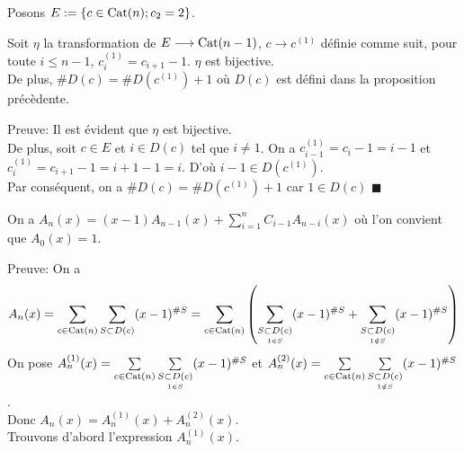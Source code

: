 Posons $E:=\{c \in \begin{rm}Cat\end{rm}(n); c_{2}=2\}$.
\begin{lemme}
	Soit $\eta$ la transformation de $E \longrightarrow \begin{rm}Cat\end{rm}(n-1)$, $c\longrightarrow c^{(1)}$ définie comme suit, pour toute $i\leq n-1$, $c_{i}^{(1)}=c_{i+1}-1$. $\eta$ est bijective.\vspace{5pt}\\
	De plus, $\#D(c) = \#D(c^{(1)}) +1$ où $D(c)$ est défini dans la proposition précèdente.
\end{lemme}
Preuve: Il est évident que $\eta$ est bijective.\\
De plus, soit $c\in E$ et $i\in D(c)$ tel que $i\neq 1$. On a $c^{(1)}_{i-1}=c_{i}-1=i-1$ et \\$c^{(1)}_{i}=c_{i+1}-1=i+1-1=i$. D'où $i-1\in D(c^{(1)})$. \\
Par conséquent, on a $\#D(c) = \#D(c^{(1)}) +1 $ car $1\in D(c)$
$\blacksquare$
\begin{proposition} \label{prop225}
	On a $A_{n}(x)=(x-1)A_{n-1}(x)+ \sum\limits_{i=1}^{n}C_{i-1}A_{n-i}(x)$ où l'on convient que $A_{0}(x)=1$.
\end{proposition}
Preuve: On a $$A_{n}(x)= \sum\limits_{c\in \begin{rm}Cat\end{rm}(n)}\sum\limits_{S\subset D(c)}(x-1)^{\# S}=\sum\limits_{c\in \begin{rm}Cat\end{rm}(n)}\left( \sum\limits_{\underset{1\in S}{S\subset D(c)}}(x-1)^{\#S} + \sum \limits_{\underset{1\notin S}{S\subset D(c)}} (x-1)^{\#S} \right)$$
On pose $A_{n}^{(1)}(x)=\sum\limits_{c\in \begin{rm}Cat\end{rm}(n)}\sum\limits_{\underset{1\in S}{S\subset D(c)}}(x-1)^{{\#S}}$ et $A_{n}^{(2)}(x)=\sum\limits_{c\in \begin{rm}Cat\end{rm}(n)}\sum\limits_{\underset{1\notin S}{S\subset D(c)}}(x-1)^{{\#S}}$. \\
Donc $A_{n}(x) = A_{n}^{(1)}(x) + A_{n}^{(2)}(x)$.\vspace{15pt}\\
Trouvons d'abord l'expression $A_{n}^{(1)}(x)$.\\
